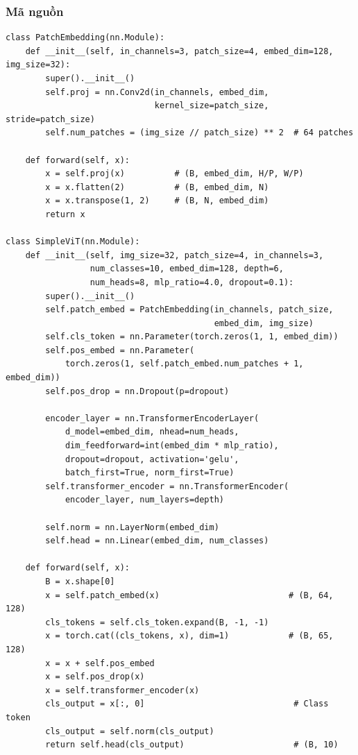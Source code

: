 \documentclass[a4paper]{article}
\theoremstyle{definition}
\begin{document}
\subsubsection{Mã nguồn}
\begin{verbatim}
class PatchEmbedding(nn.Module):
    def __init__(self, in_channels=3, patch_size=4, embed_dim=128, img_size=32):
        super().__init__()
        self.proj = nn.Conv2d(in_channels, embed_dim,
                              kernel_size=patch_size, stride=patch_size)
        self.num_patches = (img_size // patch_size) ** 2  # 64 patches

    def forward(self, x):
        x = self.proj(x)          # (B, embed_dim, H/P, W/P)
        x = x.flatten(2)          # (B, embed_dim, N)
        x = x.transpose(1, 2)     # (B, N, embed_dim)
        return x

class SimpleViT(nn.Module):
    def __init__(self, img_size=32, patch_size=4, in_channels=3,
                 num_classes=10, embed_dim=128, depth=6,
                 num_heads=8, mlp_ratio=4.0, dropout=0.1):
        super().__init__()
        self.patch_embed = PatchEmbedding(in_channels, patch_size,
                                          embed_dim, img_size)
        self.cls_token = nn.Parameter(torch.zeros(1, 1, embed_dim))
        self.pos_embed = nn.Parameter(
            torch.zeros(1, self.patch_embed.num_patches + 1, embed_dim))
        self.pos_drop = nn.Dropout(p=dropout)

        encoder_layer = nn.TransformerEncoderLayer(
            d_model=embed_dim, nhead=num_heads,
            dim_feedforward=int(embed_dim * mlp_ratio),
            dropout=dropout, activation='gelu',
            batch_first=True, norm_first=True)
        self.transformer_encoder = nn.TransformerEncoder(
            encoder_layer, num_layers=depth)

        self.norm = nn.LayerNorm(embed_dim)
        self.head = nn.Linear(embed_dim, num_classes)

    def forward(self, x):
        B = x.shape[0]
        x = self.patch_embed(x)                          # (B, 64, 128)
        cls_tokens = self.cls_token.expand(B, -1, -1)
        x = torch.cat((cls_tokens, x), dim=1)            # (B, 65, 128)
        x = x + self.pos_embed
        x = self.pos_drop(x)
        x = self.transformer_encoder(x)
        cls_output = x[:, 0]                              # Class token
        cls_output = self.norm(cls_output)
        return self.head(cls_output)                      # (B, 10)
\end{verbatim}
\end{document}
